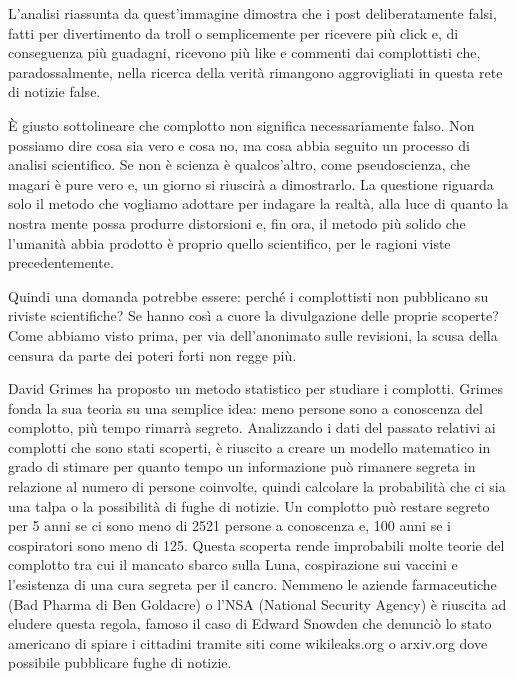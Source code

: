 \documentclass[12pt]{book} %
\begin{document}
\begin{mdframed}[linewidth=1pt]
L'analisi riassunta da quest'immagine dimostra che i post deliberatamente
falsi, fatti per divertimento da troll o semplicemente per ricevere più click e, di conseguenza più guadagni, ricevono
più like e commenti dai complottisti che, paradossalmente, nella ricerca della verità rimangono aggrovigliati in questa
rete di notizie false.

È giusto sottolineare che complotto non significa necessariamente falso. Non possiamo dire cosa sia vero e cosa no, ma
cosa abbia seguito un processo di analisi scientifico. Se non è scienza è
qualcos'altro, come pseudoscienza, che magari è pure vero e, un giorno si riuscirà a dimostrarlo. 
La questione riguarda solo il metodo che vogliamo adottare per indagare la realtà, alla luce di quanto la
nostra mente possa produrre distorsioni e, fin ora, il metodo più solido che l'umanità abbia
prodotto è proprio quello scientifico, per le ragioni viste precedentemente.

Quindi una domanda potrebbe essere: perché i complottisti non pubblicano su riviste scientifiche? Se hanno così a cuore
la divulgazione delle proprie scoperte? Come abbiamo visto prima, per via dell'anonimato sulle
revisioni, la scusa della censura da parte dei poteri forti non regge più. 


David Grimes ha proposto un metodo statistico per studiare i
complotti. Grimes fonda la sua
teoria su una semplice idea: meno persone sono a conoscenza del complotto, più tempo rimarrà segreto.
Analizzando i dati del passato relativi ai complotti che sono stati scoperti, è riuscito a creare un modello matematico
in grado di stimare per quanto tempo un informazione può rimanere segreta in relazione al numero di persone coinvolte,
quindi calcolare la probabilità che ci sia una talpa o la possibilità di fughe di notizie.
Un complotto può restare segreto per 5 anni se ci sono meno di 2521 persone a conoscenza e, 100 anni se i cospiratori
sono meno di 125.
Questa scoperta rende improbabili molte teorie del complotto tra cui il mancato sbarco sulla Luna, cospirazione sui vaccini e l'esistenza di una cura segreta per il cancro.
Nemmeno le aziende farmaceutiche (Bad Pharma di Ben
Goldacre) o
l'NSA (National Security Agency) è riuscita ad eludere questa regola, famoso il caso di Edward
Snowden che denunciò lo stato americano di spiare i cittadini tramite siti come wikileaks.org o arxiv.org dove
possibile pubblicare fughe di notizie.


\end{mdframed}
\end{document}
